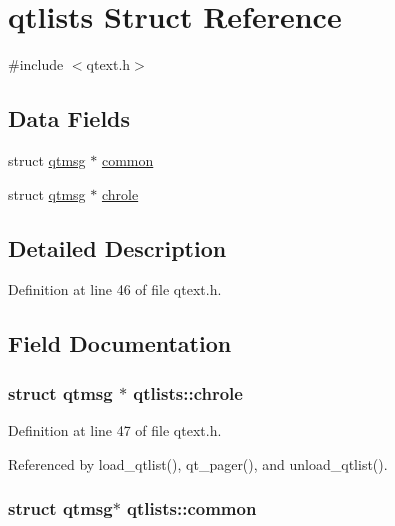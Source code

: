 \hypertarget{structqtlists}{\section{qtlists Struct Reference}
\label{structqtlists}
}


{\ttfamily \#include $<$qtext.\+h$>$}

\subsection*{Data Fields}
\begin{DoxyCompactItemize}
\item 
struct \hyperlink{structqtmsg}{qtmsg} $\ast$ \hyperlink{structqtlists_a8270da46f3805bf94c58c27ad8ac7694}{common}
\item 
struct \hyperlink{structqtmsg}{qtmsg} $\ast$ \hyperlink{structqtlists_a5bd19d1503d304d3b55f89dc26c45f1a}{chrole}
\end{DoxyCompactItemize}


\subsection{Detailed Description}


Definition at line 46 of file qtext.\+h.



\subsection{Field Documentation}
\hypertarget{structqtlists_a5bd19d1503d304d3b55f89dc26c45f1a}{
\subsubsection[{chrole}]{\setlength{\rightskip}{0pt plus 5cm}struct {\bf qtmsg} $\ast$ qtlists\+::chrole}}\label{structqtlists_a5bd19d1503d304d3b55f89dc26c45f1a}


Definition at line 47 of file qtext.\+h.



Referenced by load\+\_\+qtlist(), qt\+\_\+pager(), and unload\+\_\+qtlist().

\hypertarget{structqtlists_a8270da46f3805bf94c58c27ad8ac7694}{
\subsubsection[{common}]{\setlength{\rightskip}{0pt plus 5cm}struct {\bf qtmsg}$\ast$ qtlists\+::common}}\label{structqtlists_a8270da46f3805bf94c58c27ad8ac7694}


